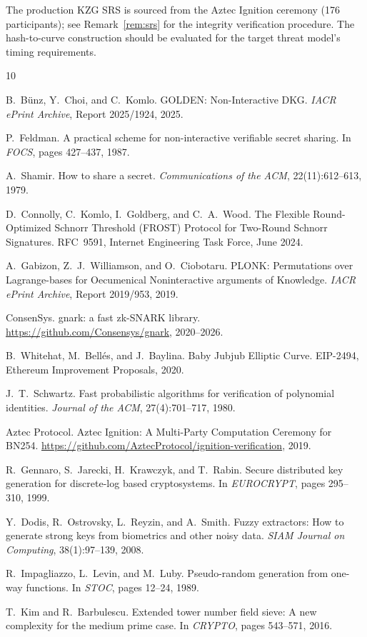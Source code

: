 \documentclass[11pt,a4paper]{article}
\begin{document}
The production KZG SRS is sourced from the Aztec Ignition ceremony (176
participants); see Remark~\ref{rem:srs} for the integrity verification
procedure. The hash-to-curve construction should be evaluated for the target
threat model's timing requirements.

\begin{thebibliography}{10}

  B.~B\"unz, Y.~Choi, and C.~Komlo.
  GOLDEN: Non-Interactive DKG.
  \emph{IACR ePrint Archive}, Report 2025/1924, 2025.

  P.~Feldman.
  A practical scheme for non-interactive verifiable secret sharing.
  In \emph{FOCS}, pages 427--437, 1987.

  A.~Shamir.
  How to share a secret.
  \emph{Communications of the ACM}, 22(11):612--613, 1979.

  D.~Connolly, C.~Komlo, I.~Goldberg, and C.~A.~Wood.
  The Flexible Round-Optimized Schnorr Threshold (FROST) Protocol for
  Two-Round Schnorr Signatures.
  RFC~9591, Internet Engineering Task Force, June 2024.

  A.~Gabizon, Z.~J.~Williamson, and O.~Ciobotaru.
  PLONK: Permutations over Lagrange-bases for Oecumenical Noninteractive
  arguments of Knowledge.
  \emph{IACR ePrint Archive}, Report 2019/953, 2019.

  ConsenSys.
  gnark: a fast zk-SNARK library.
  \url{https://github.com/Consensys/gnark}, 2020--2026.

  B.~Whitehat, M.~Bellés, and J.~Baylina.
  Baby Jubjub Elliptic Curve.
  EIP-2494, Ethereum Improvement Proposals, 2020.

  J.~T.~Schwartz.
  Fast probabilistic algorithms for verification of polynomial identities.
  \emph{Journal of the ACM}, 27(4):701--717, 1980.

  Aztec Protocol.
  Aztec Ignition: A Multi-Party Computation Ceremony for BN254.
  \url{https://github.com/AztecProtocol/ignition-verification}, 2019.

  R.~Gennaro, S.~Jarecki, H.~Krawczyk, and T.~Rabin.
  Secure distributed key generation for discrete-log based cryptosystems.
  In \emph{EUROCRYPT}, pages 295--310, 1999.

  Y.~Dodis, R.~Ostrovsky, L.~Reyzin, and A.~Smith.
  Fuzzy extractors: How to generate strong keys from biometrics and other
  noisy data.
  \emph{SIAM Journal on Computing}, 38(1):97--139, 2008.

  R.~Impagliazzo, L.~Levin, and M.~Luby.
  Pseudo-random generation from one-way functions.
  In \emph{STOC}, pages 12--24, 1989.

  T.~Kim and R.~Barbulescu.
  Extended tower number field sieve: A new complexity for the medium prime
  case.
  In \emph{CRYPTO}, pages 543--571, 2016.

\end{thebibliography}
\end{document}
